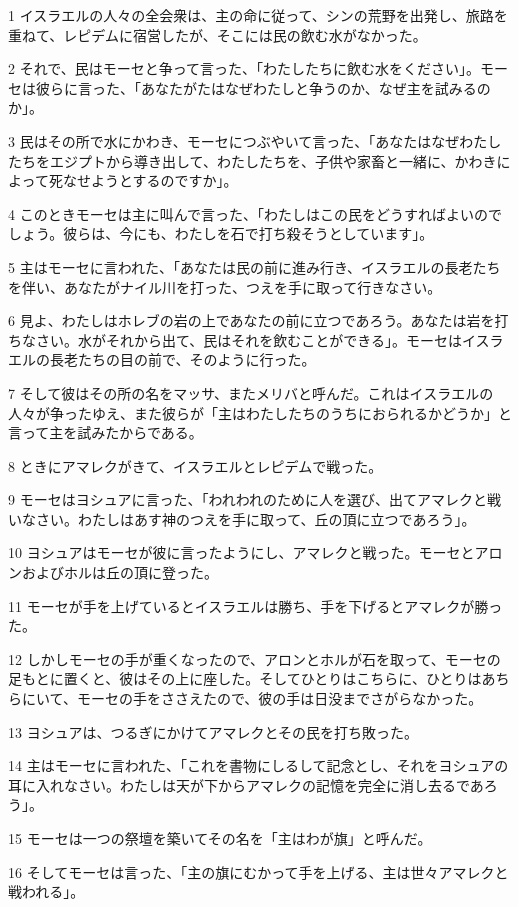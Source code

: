 \par 1 イスラエルの人々の全会衆は、主の命に従って、シンの荒野を出発し、旅路を重ねて、レピデムに宿営したが、そこには民の飲む水がなかった。
\par 2 それで、民はモーセと争って言った、「わたしたちに飲む水をください」。モーセは彼らに言った、「あなたがたはなぜわたしと争うのか、なぜ主を試みるのか」。
\par 3 民はその所で水にかわき、モーセにつぶやいて言った、「あなたはなぜわたしたちをエジプトから導き出して、わたしたちを、子供や家畜と一緒に、かわきによって死なせようとするのですか」。
\par 4 このときモーセは主に叫んで言った、「わたしはこの民をどうすればよいのでしょう。彼らは、今にも、わたしを石で打ち殺そうとしています」。
\par 5 主はモーセに言われた、「あなたは民の前に進み行き、イスラエルの長老たちを伴い、あなたがナイル川を打った、つえを手に取って行きなさい。
\par 6 見よ、わたしはホレブの岩の上であなたの前に立つであろう。あなたは岩を打ちなさい。水がそれから出て、民はそれを飲むことができる」。モーセはイスラエルの長老たちの目の前で、そのように行った。
\par 7 そして彼はその所の名をマッサ、またメリバと呼んだ。これはイスラエルの人々が争ったゆえ、また彼らが「主はわたしたちのうちにおられるかどうか」と言って主を試みたからである。
\par 8 ときにアマレクがきて、イスラエルとレピデムで戦った。
\par 9 モーセはヨシュアに言った、「われわれのために人を選び、出てアマレクと戦いなさい。わたしはあす神のつえを手に取って、丘の頂に立つであろう」。
\par 10 ヨシュアはモーセが彼に言ったようにし、アマレクと戦った。モーセとアロンおよびホルは丘の頂に登った。
\par 11 モーセが手を上げているとイスラエルは勝ち、手を下げるとアマレクが勝った。
\par 12 しかしモーセの手が重くなったので、アロンとホルが石を取って、モーセの足もとに置くと、彼はその上に座した。そしてひとりはこちらに、ひとりはあちらにいて、モーセの手をささえたので、彼の手は日没までさがらなかった。
\par 13 ヨシュアは、つるぎにかけてアマレクとその民を打ち敗った。
\par 14 主はモーセに言われた、「これを書物にしるして記念とし、それをヨシュアの耳に入れなさい。わたしは天が下からアマレクの記憶を完全に消し去るであろう」。
\par 15 モーセは一つの祭壇を築いてその名を「主はわが旗」と呼んだ。
\par 16 そしてモーセは言った、「主の旗にむかって手を上げる、主は世々アマレクと戦われる」。

